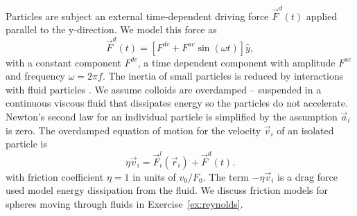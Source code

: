 \documentclass[twocolumn,preprintnumbers,amsmath,amssymb,aps,prx]{revtex4}
\begin{document}
 Particles are subject an external time-dependent driving force
$\vec{F}^{d}(t)$
applied parallel to the y-direction.
We model this force as
\begin{equation}
  \vec{F}^{d}(t) = [F^{dc} + F^{ac} \sin(\omega t)] \hat{y},
    \label{eq:drive}
\end{equation}
with %
a constant component $F^{dc}$,
a time dependent component with amplitude $F^{ac}$
and frequency $\omega = 2 \pi f$.
The inertia of 
small particles is reduced by interactions
with fluid particles \cite{Purcell1977}.
We assume 
colloids are overdamped
-- suspended in a continuous viscous fluid
that dissipates energy %
so the particles do not accelerate.
Newton's second law for an individual particle
is simplified
by the assumption $\vec{a}_i$ is zero. %
The overdamped equation of motion for
the velocity $\vec{v}_i$ of 
an isolated particle is
\begin{equation}
  \eta \vec{v}_i = \vec{F}^l_{i}(\vec{r}_i) + \vec{F}^{d}(t).
    \label{eq:motion}
\end{equation}
with friction coefficient $\eta = 1$ in units of $v_0 / F_0$. 
The term $-\eta \vec{v}_i$
is a drag force used model 
energy dissipation from the fluid. 
We discuss friction models for
spheres moving through fluids in 
Exercise~\ref{ex:reynolds}. %
\end{document}
